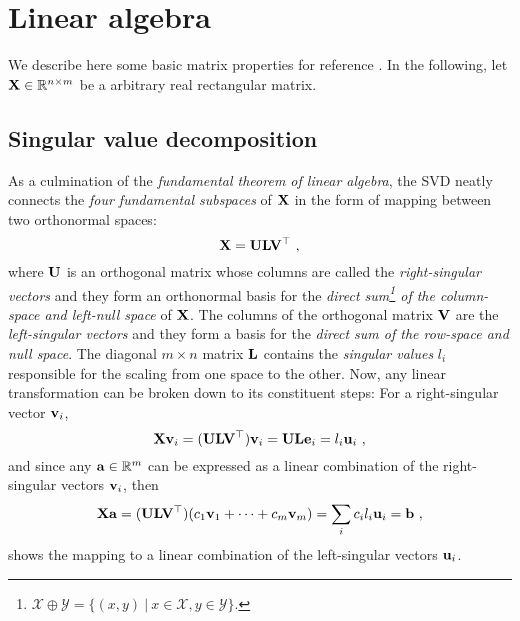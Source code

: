 

  \section{Linear algebra} \label{sec:app1_linear_algebra}

    We describe here some basic matrix properties for reference \citep{Golub:matrix96, Strang:introduction03, Horn:matrix90}. In the following, let $\mathbf{X}\in \mathbb{R}^{n \times m}$ be a arbitrary real rectangular matrix.


    \subsection{Singular value decomposition}
      As a culmination of the \emph{fundamental theorem of linear algebra}, the SVD neatly connects the \emph{four fundamental subspaces} of $\mathbf{X}$ in the form of mapping between two orthonormal spaces:
      \begin{equation}
	\mathbf{X} = \mathbf{U} \mathbf{L} \mathbf{V}^\top  ~,
      \end{equation}
      where $\mathbf{U}$ is an orthogonal matrix whose columns are called the \emph{right-singular vectors} and they form an orthonormal basis for the \emph{direct sum\footnote{$\mathcal{X} \oplus \mathcal{Y} = \{ (x,y) ~|~ x \in \mathcal{X}, y \in \mathcal{Y}\}$.} of the column-space and left-null space} of $\mathbf{X}$. The columns of the orthogonal matrix $\mathbf{V}$ are the \emph{left-singular vectors} and they form a basis for the \emph{direct sum of the row-space and null space}. The diagonal $m \times n$ matrix $\mathbf{L}$ contains the \emph{singular values} $l_i$ responsible for the scaling from one space to the other. Now, any linear transformation can be broken down to its constituent steps: For a right-singular vector $\mathbf{v}_i$,
      \[
	\mathbf{X} \mathbf{v}_i = (\mathbf{U} \mathbf{L} \mathbf{V}^\top) \mathbf{v}_i = \mathbf{U}\mathbf{L} \mathbf{e}_i = l_i \mathbf{u}_i ~,
      \]
      and since any $\mathbf{a} \in \mathbb{R}^m$ can be expressed as a linear combination of the right-singular vectors $\mathbf{v}_i$, then
      \[
	\mathbf{X}\mathbf{a} =  (\mathbf{U} \mathbf{L} \mathbf{V}^\top) (c_1 \mathbf{v}_1 + \dots + c_m \mathbf{v}_m) = \sum_i c_i l_i \mathbf{u}_i = \mathbf{b} ~,
      \]
      shows the mapping to a linear combination of the left-singular vectors $\mathbf{u}_i$.

